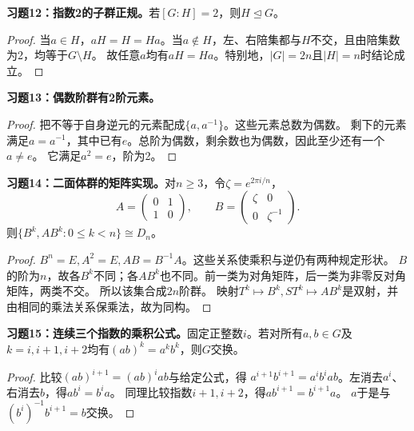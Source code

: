 \begin{problem}
\textbf{习题12：指数2的子群正规。}若$[G:H]=2$，则$H\trianglelefteq G$。
\end{problem}
\begin{proof}
当$a\in H$，$aH=H=Ha$。当$a\notin H$，左、右陪集都与$H$不交，且由陪集数为2，均等于$G\setminus H$。
故任意$a$均有$aH=Ha$。特别地，$|G|=2n$且$|H|=n$时结论成立。
\end{proof}

\begin{problem}
\textbf{习题13：偶数阶群有2阶元素。}
\end{problem}
\begin{proof}
把不等于自身逆元的元素配成$\{a,a^{-1}\}$。这些元素总数为偶数。
剩下的元素满足$a=a^{-1}$，其中已有$e$。总阶为偶数，剩余数也为偶数，因此至少还有一个$a\neq e$。
它满足$a^2=e$，阶为2。
\end{proof}

\begin{problem}
\textbf{习题14：二面体群的矩阵实现。}对$n\geq3$，令$\zeta=e^{2\pi i/n}$，
\[
A=\begin{pmatrix}0&1\\1&0\end{pmatrix},\qquad B=\begin{pmatrix}\zeta&0\\0&\zeta^{-1}\end{pmatrix}.
\]
则$\{B^k,AB^k:0\leq k<n\}\cong D_n$。
\end{problem}
\begin{proof}
$B^n=E,A^2=E,AB=B^{-1}A$。这些关系使乘积与逆仍有两种规定形状。
$B$的阶为$n$，故各$B^k$不同；各$AB^k$也不同。前一类为对角矩阵，后一类为非零反对角矩阵，两类不交。
所以该集合成$2n$阶群。
映射$T^k\mapsto B^k,ST^k\mapsto AB^k$是双射，并由相同的乘法关系保乘法，故为同构。
\end{proof}

\begin{problem}
\textbf{习题15：连续三个指数的乘积公式。}固定正整数$i$。若对所有$a,b\in G$及$k=i,i+1,i+2$均有$(ab)^k=a^kb^k$，则$G$交换。
\end{problem}
\begin{proof}
比较$(ab)^{i+1}=(ab)^i ab$与给定公式，得
$a^{i+1}b^{i+1}=a^ib^iab$。左消去$a^i$、右消去$b$，得$ab^i=b^ia$。
同理比较指数$i+1,i+2$，得$ab^{i+1}=b^{i+1}a$。
$a$于是与$(b^i)^{-1}b^{i+1}=b$交换。
\end{proof}

